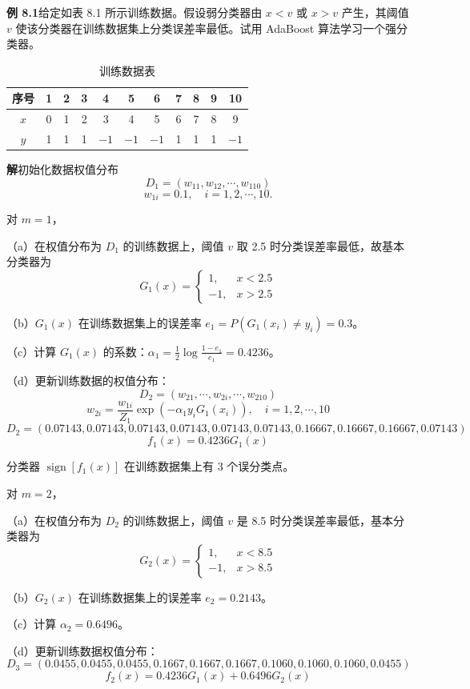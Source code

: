 \documentclass[UTF8, 12pt, fontset=fandol, oneside]{ctexart}
\begin{document}
\noindent\textbf{例 8.1}\quad 给定如表 8.1 所示训练数据。假设弱分类器由 $x<v$ 或 $x>v$ 产生，其阈值 $v$ 使该分类器在训练数据集上分类误差率最低。试用 AdaBoost 算法学习一个强分类器。

\begin{table}[htbp]
\centering
\caption{训练数据表}
\begin{tabular}{c*{10}{c}}
\toprule
序号 & 1 & 2 & 3 & 4 & 5 & 6 & 7 & 8 & 9 & 10\\
\midrule
$x$ & 0 & 1 & 2 & 3 & 4 & 5 & 6 & 7 & 8 & 9\\
$y$ & 1 & 1 & 1 & $-1$ & $-1$ & $-1$ & 1 & 1 & 1 & $-1$\\
\bottomrule
\end{tabular}
\end{table}

\noindent\textbf{解}\quad 初始化数据权值分布
\[
D_1=(w_{11},w_{12},\cdots,w_{110})
\]
\[
w_{1i}=0.1,\quad i=1,2,\cdots,10.
\]

对 $m=1$，

（a）在权值分布为 $D_1$ 的训练数据上，阈值 $v$ 取 2.5 时分类误差率最低，故基本分类器为
\[
G_1(x)=
\begin{cases}
1, & x<2.5\\
-1, & x>2.5
\end{cases}
\]

（b）$G_1(x)$ 在训练数据集上的误差率 $e_1=P(G_1(x_i)\ne y_i)=0.3$。

（c）计算 $G_1(x)$ 的系数：$\alpha_1=\frac{1}{2}\log\frac{1-e_1}{e_1}=0.4236$。

（d）更新训练数据的权值分布：
\[
D_2=(w_{21},\cdots,w_{2i},\cdots,w_{210})
\]
\[
w_{2i}=\frac{w_{1i}}{Z_1}\exp(-\alpha_1y_iG_1(x_i)),\quad i=1,2,\cdots,10
\]
\[
D_2=(0.07143,0.07143,0.07143,0.07143,0.07143,0.07143,
0.16667,0.16667,0.16667,0.07143)
\]
\[
f_1(x)=0.4236G_1(x)
\]

分类器 $\operatorname{sign}[f_1(x)]$ 在训练数据集上有 3 个误分类点。

对 $m=2$，

（a）在权值分布为 $D_2$ 的训练数据上，阈值 $v$ 是 8.5 时分类误差率最低，基本分类器为
\[
G_2(x)=
\begin{cases}
1, & x<8.5\\
-1, & x>8.5
\end{cases}
\]

（b）$G_2(x)$ 在训练数据集上的误差率 $e_2=0.2143$。

（c）计算 $\alpha_2=0.6496$。

（d）更新训练数据权值分布：
\[
D_3=(0.0455,0.0455,0.0455,0.1667,0.1667,0.1667,
0.1060,0.1060,0.1060,0.0455)
\]
\[
f_2(x)=0.4236G_1(x)+0.6496G_2(x)
\]
\end{document}
